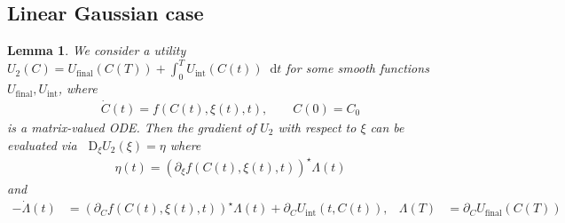 \documentclass[10pt]{article}
\numberwithin{equation}{section}
\numberwithin{figure}{section}
\newtheorem{lem}[thm]{Lemma}
\theoremstyle{remark}
\newcommand{\dd }{\mathop{}\!\mathrm{d}}
\newcommand{\DD }{\mathop{}\!\mathrm{D}}
\begin{document}
\subsection{Linear Gaussian case}
\begin{lem}\label{lem:gradient_matrix}
We consider a utility $U_2(C) = U_\mathrm{final}(C(T)) + \int_0^T U_\mathrm{int}(C(t))\dd t$ for some smooth functions $U_\mathrm{final},U_\mathrm{int}$, where 
\begin{align}\label{eq:C_ODE_adjoint}
    \dot C(t) = f(C(t), \xi(t), t),\qquad C(0) = C_0
\end{align}
is a matrix-valued ODE. Then the gradient of $U_2$ with respect to $\xi$ can be evaluated via $\DD_\xi U_2(\xi) = \eta$ where
\begin{align*}
    \eta(t) = (\partial_\xi f(C(t),\xi(t),t))^\star \Lambda(t)
\end{align*}
and
\begin{align*}
    -\dot \Lambda(t) &= (\partial_C f(C(t),\xi(t),t))^\star \Lambda(t) + \partial_C U_\mathrm{int}(t,C(t)), &\Lambda(T) &= \partial_C U_\mathrm{final}(C(T))
\end{align*}
\end{lem}
\end{document}
